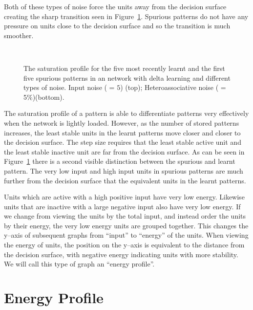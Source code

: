 Both of these types of noise force the units away from the decision surface creating the sharp transition seen in Figure~\ref{fig:SaturationProfileDelta}. Spurious patterns do not have any pressure on units close to the decision surface and so the transition is much smoother.


\begin{figure}[p]
\small
\center
	
	\vspace{1cm}\\
	
\caption{The saturation profile for the five most recently learnt and the first five spurious patterns in an  network with delta learning and different types of noise.  Input noise ( = $5$) (top); Heteroassociative noise ( = 5\%)(bottom).}
	\label{fig:SaturationProfileDelta}
\end{figure}


The saturation profile of a pattern is able to differentiate patterns very effectively when the network is lightly loaded.  However, as the number of stored patterns increases, the least stable units in the learnt patterns move closer and closer to the decision surface.  The step size requires that the least stable active unit and the least stable inactive unit are far from the decision surface.  As can be seen in Figure~\ref{fig:SaturationProfileDelta} there is a second visible distinction between the spurious and learnt pattern.  The very low input and high input units in spurious patterns are much further from the decision surface that the equivalent units in the learnt patterns. 

Units which are active with a high positive input have very low energy.  Likewise units that are inactive with a large negative input also have very low energy.  If we change from viewing the units by the total input, and instead order the units by their energy, the very low energy units are grouped together.  This changes the y--axis of subsequent  graphs from ``input'' to ``energy'' of the units.  When viewing the energy of units, the position on the y--axis is equivalent to the distance from the decision surface, with negative energy indicating units with more stability.  We will call this type of graph an ``energy profile''.

\section{Energy Profile}

